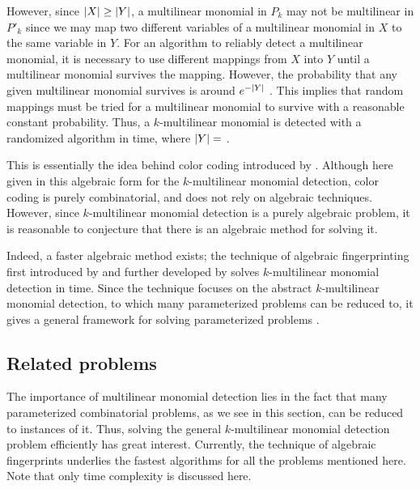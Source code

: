 However, since ${\left\vert X\right\vert} \geq {\left\vert Y\right\vert}$, 
a multilinear monomial in $P_k$ may not be multilinear in $P'_k$ since 
we may map two different variables of a multilinear monomial in $X$ 
to the same variable in $Y$. 
For an algorithm to reliably detect a multilinear monomial, 
it is necessary to use different mappings 
from $X$ into $Y$ until a multilinear monomial survives the mapping. 
However, the probability that any given 
multilinear monomial survives
is around $e^{-{\left\vert Y\right\vert}}$ \cite{KouWil15}. 
This implies that 
 random mappings must be tried for a 
multilinear monomial to survive with a reasonable constant probability. Thus, a 
$k$-multilinear monomial is detected with a 
randomized algorithm in  time, where ${\left\vert Y\right\vert} =$ .

This is essentially the idea behind color coding 
introduced by \textcite{Alon95}. 
Although here given in this algebraic form for 
the $k$-multilinear monomial detection, 
color coding is purely combinatorial, 
and does not rely on algebraic techniques. 
However, since $k$-multilinear monomial detection is a 
purely algebraic problem, it is reasonable to 
conjecture that there is an algebraic method for solving it.

Indeed, a faster algebraic method exists; the technique of algebraic fingerprinting 
first introduced by \textcite{Koutis08} and 
further developed by \textcite{Williams09} 
solves $k$-multilinear monomial detection in  time. 
Since the technique focuses on the abstract $k$-multilinear monomial detection, 
to which many parameterized problems can be reduced to, 
it gives a general framework for 
solving parameterized problems \cite{KouWil15}.

\subsection{Related problems}
\label{sect:related_problems}

The importance of multilinear monomial detection lies in the fact 
that many parameterized combinatorial problems, as we see in this section, 
can be reduced to instances of it. 
Thus, solving the general $k$-multilinear monomial detection problem 
efficiently has great interest. 
Currently, the technique of algebraic fingerprints underlies the fastest algorithms 
for all the problems mentioned here. 
Note that only time complexity is discussed here. 

